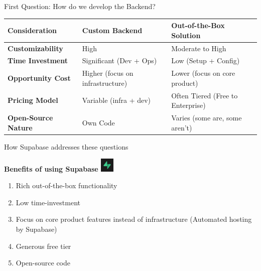\documentclass{beamer}
\begin{document}
\begin{frame}{First Question: How do we develop the Backend?}
    \begin{tabular}{|p{}|p{}|p{}|}
        \hline
        \textbf{Consideration} & \textbf{Custom Backend} & \textbf{Out-of-the-Box Solution} \\
        \hline
        \textbf{Customizability} & High & Moderate to High \\
        \hline
        \textbf{Time Investment} & Significant (Dev + Ops) & Low (Setup + Config) \\
        \hline
        \textbf{Opportunity Cost} & Higher (focus on infrastructure) & Lower (focus on core product) \\
        \hline
        \textbf{Pricing Model} & Variable (infra + dev) & Often Tiered (Free to Enterprise) \\
        \hline
        \textbf{Open-Source Nature} & Own Code & Varies (some are, some aren't) \\
        \hline
    \end{tabular}
\end{frame}

\begin{frame}{How Supabase addresses these questions}
    \begin{block}{\textbf{Benefits of using Supabase \includegraphics[width=0.05\textwidth]{pic2.jpeg}}}
        \begin{enumerate}
            \item Rich out-of-the-box functionality
            \item Low time-investment
            \item Focus on core product features instead of infrastructure (Automated hosting by Supabase)
            \item Generous free tier
            \item Open-source code
        \end{enumerate}
    \end{block}
\end{frame}
\end{document}
